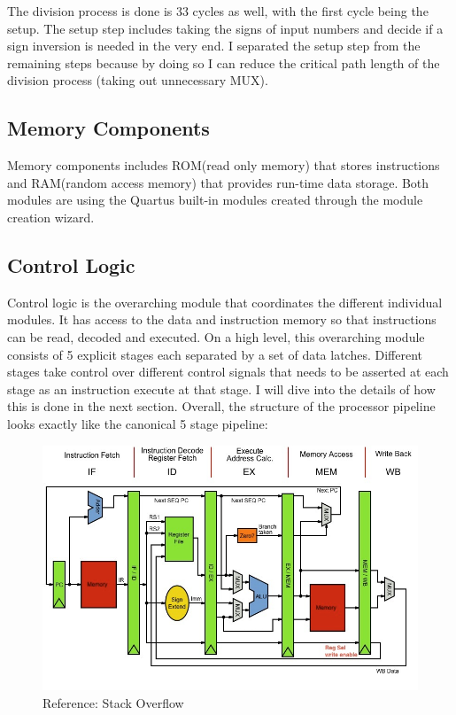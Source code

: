 \documentclass{article}
\begin{document}
		The division process is done is 33 cycles as well, with the first cycle being the setup. The setup step includes taking the signs of input numbers and decide if a sign inversion is needed in the very end. I separated the setup step from the remaining steps because by doing so I can reduce the critical path length of the division process (taking out unnecessary MUX).
		\pagebreak
		\subsection{Memory Components}
		Memory components includes ROM(read only memory) that stores instructions and RAM(random access memory) that provides run-time data storage. Both modules are using the Quartus built-in modules created through the module creation wizard.
		\subsection{Control Logic}
		Control logic is the overarching module that coordinates the different individual modules. It has access to the data and instruction memory so that instructions can be read, decoded and executed. On a high level, this overarching module consists of 5 explicit stages each separated by a set of data latches. Different stages take control over different control signals that needs to be asserted at each stage as an instruction execute at that stage. I will dive into the details of how this is done in the next section. Overall, the structure of the processor pipeline looks exactly like the canonical 5 stage pipeline:
		\begin{figure}[h]
			\centering
			\includegraphics[width=5in]{pipeline}
			\caption{Reference: Stack Overflow}
		\end{figure}
\end{document}
